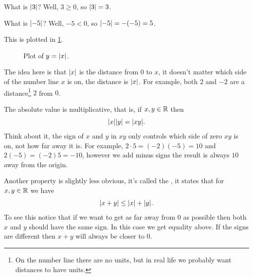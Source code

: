 \documentclass[fleqn]{LectureClass/LectureClass}
\begin{document}
    \begin{exm}{}{}
        What is \(\lvert3\rvert\)?
        Well, \(3 \ge 0\), so \(\lvert3\rvert = 3\).
        
        What is \(\lvert-5\rvert\)?
        Well, \(-5 < 0\), so \(\lvert-5\rvert = -(-5) = 5\).
    \end{exm}
    
    This is plotted in \cref{fig:abs value plot}.
    
    \begin{figure}
        \centering
        \caption{Plot of \(y = \lvert x\rvert\).}
        \label{fig:abs value plot}
    \end{figure}
    
    The idea here is that \(\lvert x\rvert\) is the distance from \(0\) to \(x\), it doesn't matter which side of the number line \(x\) is on, the distance is \(\lvert x\rvert\).
    For example, both \(2\) and \(-2\) are a  distance\footnote{On the number line there are no units, but in real life we probably want distances to have units.} \(2\) from \(0\).
    
    The absolute value is multiplicative, that is, if \(x, y \in \mathbb{R}\) then
    \begin{equation}
        \lvert x\rvert\lvert y\rvert = \lvert xy\rvert.
    \end{equation}
    Think about it, the sign of \(x\) and \(y\) in \(xy\) only controls which side of zero \(xy\) is on, not how far away it is.
    For example, \(2 \cdot 5 = (-2)(-5) = 10\) and \(2(-5) = (-2)5 = -10\), however we add minus signs the result is always \(10\) away from the origin.
    
    Another property is slightly less obvious, it's called the , it states that for \(x, y \in \mathbb{R}\) we have
    \begin{equation}
        \lvert x + y\rvert \le \lvert x\rvert + \lvert y\rvert.
    \end{equation}
    To see this notice that if we want to get as far away from \(0\) as possible then both \(x\) and \(y\) should have the same sign.
    In this case we get equality above.
    If the signs are different then \(x + y\) will always be closer to \(0\).
    
\end{document}
